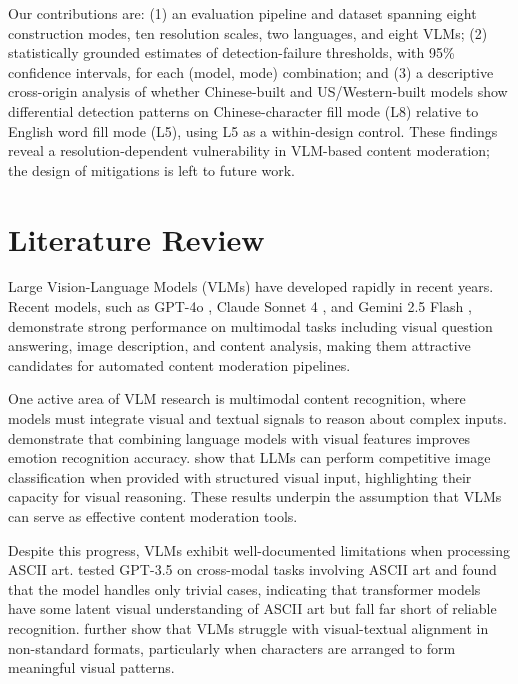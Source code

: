 \documentclass[11pt]{article}
\begin{document}
Our contributions are: (1) an evaluation pipeline and dataset spanning eight construction modes,
ten resolution scales, two languages, and eight VLMs; (2) statistically grounded estimates of
detection-failure thresholds, with 95\% confidence intervals, for each (model, mode) combination;
and (3) a descriptive cross-origin analysis of whether Chinese-built and US/Western-built models
show differential detection patterns on Chinese-character fill mode (L8) relative to English word
fill mode (L5), using L5 as a within-design control. These findings reveal a resolution-dependent vulnerability in
VLM-based content moderation; the design of mitigations is left to future work.

\section{Literature Review}

Large Vision-Language Models (VLMs) have developed rapidly in recent years. Recent models, such as
GPT-4o \citep{openai2025chatgpt}, Claude Sonnet 4 \citep{anthropic2025claude}, and Gemini 2.5
Flash \citep{google2025gemini}, demonstrate strong performance on multimodal tasks including visual
question answering, image description, and content analysis, making them attractive candidates for
automated content moderation pipelines.

One active area of VLM research is multimodal content recognition, where models must integrate
visual and textual signals to reason about complex inputs. \citet{chandraumakantham2024multimodal}
demonstrate that combining language models with visual features improves emotion recognition
accuracy. \citet{wu2024experimental} show that LLMs can perform competitive image classification
when provided with structured visual input, highlighting their capacity for visual reasoning.
These results underpin the assumption that VLMs can serve as effective content moderation tools.

Despite this progress, VLMs exhibit well-documented limitations when processing ASCII art. 
\citet{bayani2023testing} tested GPT-3.5 on cross-modal tasks
involving ASCII art and found that the model handles only trivial cases, indicating that transformer
models have some latent visual understanding of ASCII art but fall far short of reliable recognition.
\citet{wang2025text} further show that VLMs struggle with visual-textual alignment in non-standard
formats, particularly when characters are arranged to form meaningful visual patterns.
\end{document}
